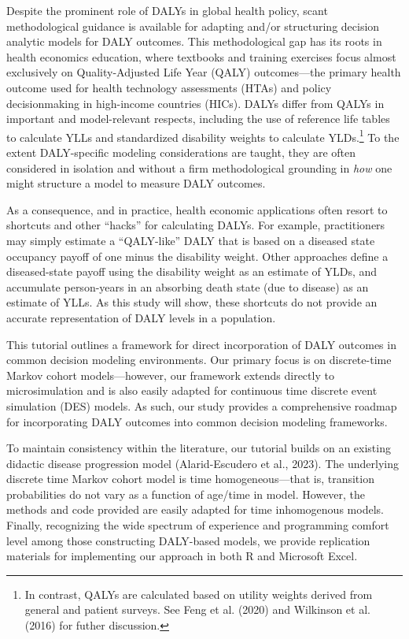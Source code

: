 \documentclass[
]{agujournal2019}
\begin{document}
Despite the prominent role of DALYs in global health policy, scant
methodological guidance is available for adapting and/or structuring
decision analytic models for DALY outcomes. This methodological gap has
its roots in health economics education, where textbooks and training
exercises focus almost exclusively on Quality-Adjusted Life Year (QALY)
outcomes---the primary health outcome used for health technology
assessments (HTAs) and policy decisionmaking in high-income countries
(HICs). DALYs differ from QALYs in important and model-relevant
respects, including the use of reference life tables to calculate YLLs
and standardized disability weights to calculate YLDs.\footnote{In
  contrast, QALYs are calculated based on utility weights derived from
  general and patient surveys. See Feng et al. (2020) and Wilkinson et
  al. (2016) for futher discussion.} To the extent DALY-specific
modeling considerations are taught, they are often considered in
isolation and without a firm methodological grounding in \emph{how} one
might structure a model to measure DALY outcomes.

As a consequence, and in practice, health economic applications often
resort to shortcuts and other ``hacks'' for calculating DALYs. For
example, practitioners may simply estimate a ``QALY-like'' DALY that is
based on a diseased state occupancy payoff of one minus the disability
weight. Other approaches define a diseased-state payoff using the
disability weight as an estimate of YLDs, and accumulate person-years in
an absorbing death state (due to disease) as an estimate of YLLs. As
this study will show, these shortcuts do not provide an accurate
representation of DALY levels in a population.

This tutorial outlines a framework for direct incorporation of DALY
outcomes in common decision modeling environments. Our primary focus is
on discrete-time Markov cohort models---however, our framework extends
directly to microsimulation and is also easily adapted for continuous
time discrete event simulation (DES) models. As such, our study provides
a comprehensive roadmap for incorporating DALY outcomes into common
decision modeling frameworks.

To maintain consistency within the literature, our tutorial builds on an
existing didactic disease progression model (Alarid-Escudero et al.,
2023). The underlying discrete time Markov cohort model is time
homogeneous---that is, transition probabilities do not vary as a
function of age/time in model. However, the methods and code provided
are easily adapted for time inhomogenous models. Finally, recognizing
the wide spectrum of experience and programming comfort level among
those constructing DALY-based models, we provide replication materials
for implementing our approach in both R and Microsoft Excel.
\end{document}
